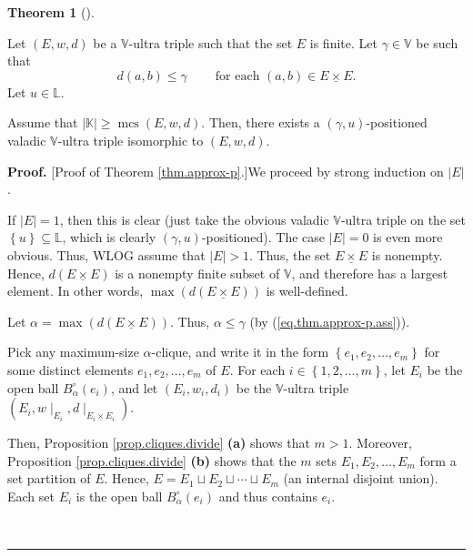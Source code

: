 \documentclass[numbers=enddot,12pt,final,onecolumn,notitlepage]{scrartcl}%
\theoremstyle{definition}
\newtheorem{theo}{Theorem}[section]
\newenvironment{theorem}[1][]
{\begin{theo}[#1]\begin{leftbar}}
{\end{leftbar}\end{theo}}
\newenvironment{proof}[1][Proof]{\noindent\textbf{#1.} }{\ \rule{0.5em}{0.5em}}
\newcommand{\timesu}{\mathbin{\underline{\times}}}
\renewcommand{\leq}{\leqslant}
\renewcommand{\geq}{\geqslant}
\theoremstyle{plainsl}
\begin{document}
\begin{theorem}
\label{thm.approx-p}Let $\left(  E,w,d\right)  $ be a $\mathbb{V}$-ultra
triple such that the set $E$ is finite. Let $\gamma\in\mathbb{V}$ be such that%
\begin{equation}
d\left(  a,b\right)  \leq\gamma\ \ \ \ \ \ \ \ \ \ \text{for each }\left(
a,b\right)  \in E\timesu E. \label{eq.thm.approx-p.ass}%
\end{equation}
Let $u\in\mathbb{L}$.

Assume that $\left\vert \mathbb{K}\right\vert \geq\operatorname*{mcs}\left(
E,w,d\right)  $. Then, there exists a $\left(  \gamma,u\right)  $-positioned
valadic $\mathbb{V}$-ultra triple isomorphic to $\left(  E,w,d\right)  $.
\end{theorem}

\begin{proof}
[Proof of Theorem \ref{thm.approx-p}.]We proceed by strong induction on
$\left\vert E\right\vert $.

If $\left\vert E\right\vert =1$, then this is clear (just take the obvious
valadic $\mathbb{V}$-ultra triple on the set $\left\{  u\right\}
\subseteq\mathbb{L}$, which is clearly $\left(  \gamma,u\right)
$-positioned). The case $\left\vert E\right\vert =0$ is even more obvious.
Thus, WLOG assume that $\left\vert E\right\vert >1$. Thus, the set $E\timesu
E$ is nonempty. Hence, $d\left(  E\timesu E\right)  $ is a nonempty finite
subset of $\mathbb{V}$, and therefore has a largest element. In other words,
$\max\left(  d\left(  E\timesu E\right)  \right)  $ is well-defined.

Let $\alpha=\max\left(  d\left(  E\timesu E\right)  \right)  $. Thus,
$\alpha\leq\gamma$ (by (\ref{eq.thm.approx-p.ass})).

Pick any maximum-size $\alpha$-clique, and write it in the form $\left\{
e_{1},e_{2},\ldots,e_{m}\right\}  $ for some distinct elements $e_{1}%
,e_{2},\ldots,e_{m}$ of $E$. For each $i\in\left\{  1,2,\ldots,m\right\}  $,
let $E_{i}$ be the open ball $B_{\alpha}^{\circ}\left(  e_{i}\right)  $, and
let $\left(  E_{i},w_{i},d_{i}\right)  $ be the $\mathbb{V}$-ultra triple
$\left(  E_{i},w\mid_{E_{i}},d\mid_{E_{i}\timesu E_{i}}\right)  $.

Then, Proposition \ref{prop.cliques.divide} \textbf{(a)} shows that $m>1$.
Moreover, Proposition \ref{prop.cliques.divide} \textbf{(b)} shows that the
$m$ sets $E_{1},E_{2},\ldots,E_{m}$ form a set partition of $E$. Hence,
$E=E_{1}\sqcup E_{2}\sqcup\cdots\sqcup E_{m}$ (an internal disjoint union).
Each set $E_{i}$ is the open ball $B_{\alpha}^{\circ}\left(  e_{i}\right)  $
and thus contains $e_{i}$.


\end{proof}
\end{document}
